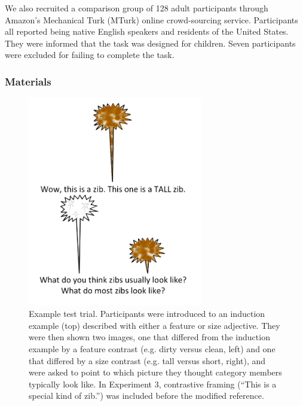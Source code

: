 \documentclass[man]{apa2}
\begin{document}
We also recruited a comparison group of 128 adult participants through Amazon's Mechanical Turk (MTurk) online crowd-sourcing service.  Participants all reported being native English speakers and residents of the United States. They were informed that the task was designed for children. Seven participants were excluded for failing to complete the task.  


\subsubsection{Materials}

\begin{figure}[t]
  \begin{center} 
    \includegraphics[width=3in]{figures/zib_demo.png} 
    \caption{\label{fig:inanimate_demo} Example test trial. Participants were introduced to an induction example (top) described with either a feature or size adjective. They were then shown two images, one that differed from the induction example by a feature contrast (e.g. dirty versus clean, left) and one that differed by a size contrast (e.g. tall versus short, right), and were asked to point to which picture they thought category members typically look like. In Experiment 3, contrastive framing (``This is a special kind of zib.'') was included before the modified reference. } 
  \end{center} 
\vspace{-10ex}
\end{figure}	
\end{document}
